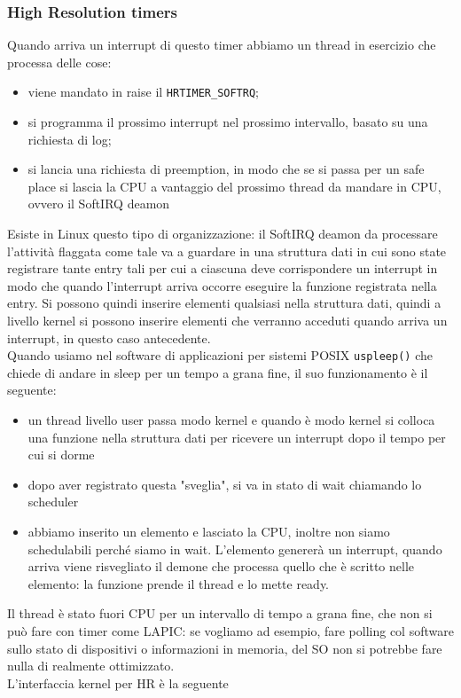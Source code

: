 \documentclass[12pt, oneside]{extbook}
\begin{document}
\subsubsection{High Resolution timers}
Quando arriva un interrupt di questo timer abbiamo un thread in esercizio che processa delle cose:
\begin{itemize}
\item viene mandato in raise il \texttt{HRTIMER\_SOFTRQ};
\item si programma il prossimo interrupt nel prossimo intervallo, basato su una richiesta di log;
\item si lancia una richiesta di preemption, in modo che se si passa per un safe place si lascia la CPU a vantaggio del prossimo thread da mandare in CPU, ovvero il SoftIRQ deamon
\end{itemize}
Esiste in Linux questo tipo di organizzazione: il SoftIRQ deamon da processare l'attività flaggata come tale va a guardare in una struttura dati in cui sono state registrare tante entry tali per cui a ciascuna deve corrispondere un interrupt in modo che quando l'interrupt arriva occorre eseguire la funzione registrata nella entry. Si possono quindi inserire elementi qualsiasi nella struttura dati, quindi a livello kernel si possono inserire elementi che verranno acceduti quando arriva un interrupt, in questo caso antecedente.\\Quando usiamo nel software di applicazioni per sistemi POSIX \texttt{uspleep()} che chiede di andare in sleep per un tempo a grana fine, il suo funzionamento è il seguente:
\begin{itemize}
\item un thread livello user passa modo kernel e quando è modo kernel si colloca una funzione nella struttura dati per ricevere un interrupt dopo il tempo per cui si dorme
\item dopo aver registrato questa "sveglia", si va in stato di wait chiamando lo scheduler
\item abbiamo inserito un elemento e lasciato la CPU, inoltre non siamo schedulabili perché siamo in wait. L'elemento genererà un interrupt, quando arriva viene risvegliato il demone che processa quello che è scritto nelle elemento: la funzione prende il thread e lo mette ready.
\end{itemize}
Il thread è stato fuori CPU per un intervallo di tempo a grana fine, che non si può fare con timer come LAPIC: se vogliamo ad esempio, fare polling col software sullo stato di dispositivi o informazioni in memoria, del SO non si potrebbe fare nulla di realmente ottimizzato.\\L'interfaccia kernel per HR è la seguente
\end{document}
